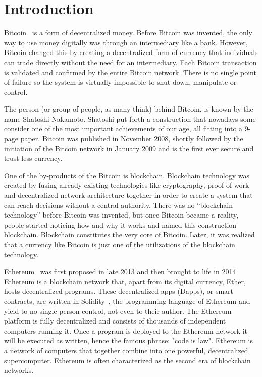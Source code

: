 \chapter{Introduction}

Bitcoin~\cite{nakamoto} is a form of decentralized money. Before Bitcoin was
invented, the only way to use money digitally was through an intermediary like
a bank. However, Bitcoin changed this by creating a decentralized form of
currency that individuals can trade directly without the need for an
intermediary. Each Bitcoin transaction is validated and confirmed by the entire
Bitcoin network.  There is no single point of failure so the system is
virtually impossible to shut down, manipulate or control.

The person (or group of people, as many think) behind Bitcoin, is known by the
name Shatoshi Nakamoto. Shatoshi put forth a construction that nowadays some
consider one of the most important achievements of our age, all fitting into a
9-page paper.  Bitcoin was published in November 2008, shortly followed by the
initiation of the Bitcoin network in January 2009 and is the first ever secure
and trust-less currency.

One of the by-products of the Bitcoin is blockchain. Blockchain technology was
created by fusing already existing technologies like cryptography, proof of
work and decentralized network architecture together in order to create a
system that can reach decisions without a central authority. There was no
“blockchain technology” before Bitcoin was invented, but once Bitcoin became a
reality, people started noticing how and why it works and named this
construction blockchain. Blockchain constitutes the very core of Bitcoin.
Later, it was realized that a currency like Bitcoin is just one of the
utilizations of the blockchain technology.

Ethereum~\cite{wood, buterin} was first proposed in late 2013 and then brought
to life in 2014.  Ethereum is a blockchain network that, apart from its digital
currency, Ether, hosts decentralized programs. These decentralized apps
(Dapps), or smart contracts, are written in Solidity~\cite{solidity}, the
programming language of Ethereum and yield to no single person control, not
even to their author.  The Ethereum platform is fully decentralized and
consists of thousands of independent computers running it. Once a program is
deployed to the Ethereum network it will be executed as written, hence the
famous phrase: "code is law".  Ethereum is a network of computers that together
combine into one powerful, decentralized supercomputer. Ethereum is often
characterized as the second era of blockchain networks.

